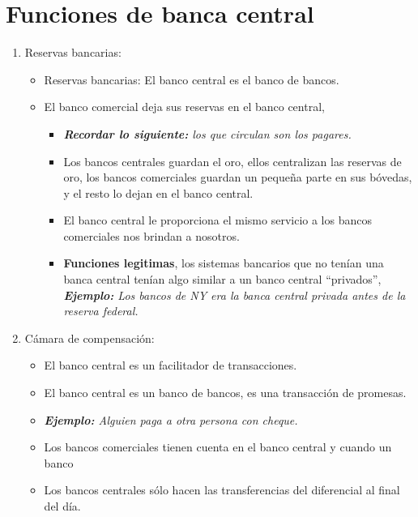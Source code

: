 \section{Funciones de banca central}
\begin{enumerate}
    \item Reservas bancarias:
        \begin{itemize}
            \item Reservas bancarias: El banco central es el banco de bancos.
            \item El banco comercial deja sus reservas en el banco central, 
                \begin{itemize}
                    \item \emph{\textbf{Recordar lo siguiente: }los que circulan son los pagares.}
                    \item Los bancos centrales guardan el oro, ellos centralizan las reservas de oro, los bancos comerciales guardan un pequeña parte en sus bóvedas, y el resto lo dejan en el banco central.
                    \item El banco central le proporciona el mismo servicio a los bancos comerciales nos brindan a nosotros.
                    \item \textbf{Funciones legitimas}, los sistemas bancarios que no tenían una banca central tenían algo similar a un banco central ``privados'', \emph{\textbf{Ejemplo: }Los bancos de NY era la banca central privada antes de la reserva federal.}
                \end{itemize}
        \end{itemize}
    
    
    \item Cámara de compensación:
        \begin{itemize}
            \item El banco central es un facilitador de transacciones.
            \item El banco central es un banco de bancos, es una transacción de promesas.
            \item \emph{\textbf{Ejemplo: }Alguien paga a otra persona con cheque.}
            \item Los bancos comerciales tienen cuenta en el banco central y cuando un banco  
            \item Los bancos centrales sólo hacen las transferencias del diferencial al final del día.
        \end{itemize}
    

\end{enumerate}
